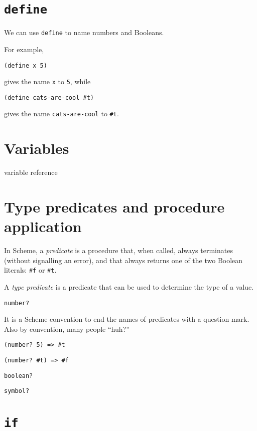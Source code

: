 \documentclass{book}
\begin{document}




\section{\texttt{define}}

We can use \verb|define| to name numbers and Booleans.

For example,

\verb|(define x 5)|

gives the name \verb|x| to \verb|5|, while

\verb|(define cats-are-cool #t)|

gives the name \verb|cats-are-cool| to \verb|#t|.

\section{Variables}

variable reference



\section{Type predicates and procedure application}

In Scheme, a \emph{predicate} is a procedure that, when called, always terminates (without signalling an error), and that always returns one of the two Boolean literals: \verb|#f| or \verb|#t|.

A \emph{type predicate} is a predicate that can be used to determine the type of a value.

\verb|number?|

It is a Scheme convention to end the names of predicates with a question mark.
Also by convention, many people ``huh?'' 

\verb|(number? 5) => #t|

\verb|(number? #t) => #f|

\verb|boolean?|

\verb|symbol?|

\section{\texttt{if}}
\end{document}

